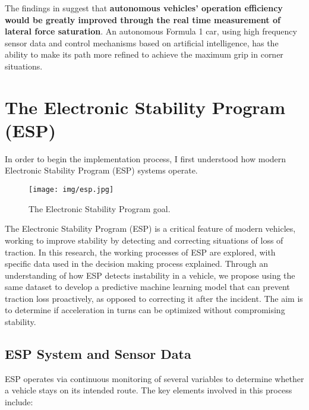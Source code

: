 \documentclass[a4paper,final,12pt]{report}
\begin{document}
The findings in \cite{Jambukolam2022} suggest that \textbf{autonomous vehicles' operation efficiency would be greatly improved through the real time measurement of lateral force saturation}. An autonomous Formula 1 car, using high frequency sensor data and control mechanisms based on artificial intelligence, has the ability to make its path more refined to achieve the maximum grip in corner situations.

\section{The Electronic Stability Program (ESP)}
In order to begin the implementation process, I first understood how modern Electronic Stability Program (ESP) systems operate.\\

\begin{figure}[hbtp]
\centering
\texttt{[image: img/esp.jpg]}
\caption{The Electronic Stability Program goal.}
\label{figura:ESP}
\end{figure}

The Electronic Stability Program (ESP) is a critical feature of modern vehicles, working to improve stability by detecting and correcting situations of loss of traction. In this research, the working processes of ESP are explored, with specific data used in the decision making process explained. Through an understanding of how ESP detects instability in a vehicle, we propose using the same dataset to develop a predictive machine learning model that can prevent traction loss proactively, as opposed to correcting it after the incident. The aim is to determine if acceleration in turns can be optimized without compromising stability.

\subsection{ESP System and Sensor Data}
ESP operates via continuous monitoring of several variables to determine whether a vehicle stays on its intended route. The key elements involved in this process include:
\end{document}
